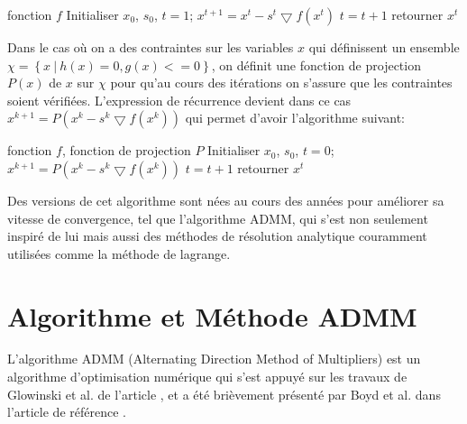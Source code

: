 \documentclass[12pt,a4paper]{report}
\begin{document}
    	\begin{algorithm}[H]
        	\caption{Descente de gradient}
        	\label{alg:desgrad1}
        	\begin{algorithmic}[1]
        	\REQUIRE fonction $f$
        	\STATE Initialiser $x_0$, $s_0$, $t=1$;
        	\REPEAT
        	\STATE $x^{t+1} = x^t - s^t \bigtriangledown{f(x^t)} $
        	\STATE $t=t+1$
        	\STATE retourner $x^t$
        	\end{algorithmic}
    	\end{algorithm}
    
    	Dans le cas où on a des contraintes sur les variables $x$ qui définissent un ensemble $\chi = \left\{x\ |\ h(x) = 0, g(x) <= 0 \right\}$, on définit une fonction de projection $P(x)$
    	de $x$ sur $\chi$ pour qu'au cours des itérations on s'assure que les contraintes soient vérifiées.
    	L'expression de récurrence devient dans ce cas $x^{k+1} = P\left( x^k - s^k \bigtriangledown f(x^k) \right)$ qui permet d'avoir l'algorithme suivant:
    
    	\begin{algorithm}[H]
        	\caption{Descente de gradient projeté}
        	\label{alg:desgrad2}
        	\begin{algorithmic}[1]
        	\REQUIRE fonction $f$, fonction de projection $P$
        	\STATE Initialiser $x_0$, $s_0$, $t=0$;
        	\REPEAT
        	\STATE $x^{k+1} = P\left( x^k - s^k \bigtriangledown f(x^k) \right)$
        	\STATE $t=t+1$
        	\STATE retourner $x^t$
        	\end{algorithmic}
    	\end{algorithm}
    
    	Des versions de cet algorithme sont nées au cours des années pour améliorer sa vitesse de convergence, tel que l'algorithme ADMM, qui s'est non seulement inspiré de lui mais aussi des méthodes de résolution analytique couramment utilisées comme la méthode de lagrange.
   	 
	\section{Algorithme et Méthode ADMM}
    
    	L'algorithme ADMM (Alternating Direction Method of Multipliers) est un algorithme d'optimisation numérique qui s'est appuyé sur les travaux de Glowinski et al. de l'article \cite{glowinski1975approximation}, et a été brièvement présenté par Boyd et al. dans l'article de référence \cite{boyd2011distributed}.
\end{document}
